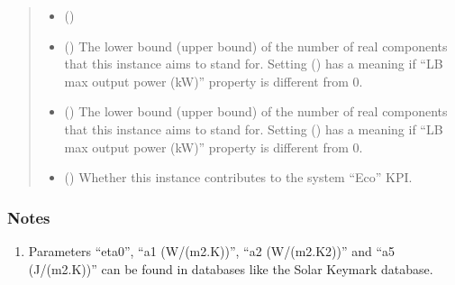 \documentclass[letterpaper,10pt,english]{sphinxmanual}
\begin{document}
\begin{fulllineitems}
\begin{fulllineitems}
\begin{quote}
\begin{description}
\begin{itemize}
\item {} 
\sphinxAtStartPar
{} (\sphinxstyleliteralemphasis{\sphinxupquote{, }}) \textendash{} 

\item {} 
\sphinxAtStartPar
{} (\sphinxstyleliteralemphasis{\sphinxupquote{, }}\sphinxstyleliteralemphasis{\sphinxupquote{, }}) \textendash{} The lower bound (upper bound) of the number of real components that this instance aims to stand for.
Setting  () has a meaning if “LB max output power (kW)” property is
different from 0.

\item {} 
\sphinxAtStartPar
{} (\sphinxstyleliteralemphasis{\sphinxupquote{, }}\sphinxstyleliteralemphasis{\sphinxupquote{, }}) \textendash{} The lower bound (upper bound) of the number of real components that this instance aims to stand for.
Setting  () has a meaning if “LB max output power (kW)” property is
different from 0.

\item {} 
\sphinxAtStartPar
{} (\sphinxstyleliteralemphasis{\sphinxupquote{, }}\sphinxstyleliteralemphasis{\sphinxupquote{, }}) \textendash{} Whether this instance contributes to the system “Eco” KPI.

\end{itemize}

\end{description}\end{quote}
\subsubsection*{Notes}
\begin{enumerate}
%
\item {} 
\sphinxAtStartPar
Parameters “eta0”, “a1 (W/(m2.K))”, “a2 (W/(m2.K2))” and “a5 (J/(m2.K))” can be found in databases like the
Solar Keymark database.


\end{enumerate}
\end{fulllineitems}
\end{fulllineitems}
\end{document}
